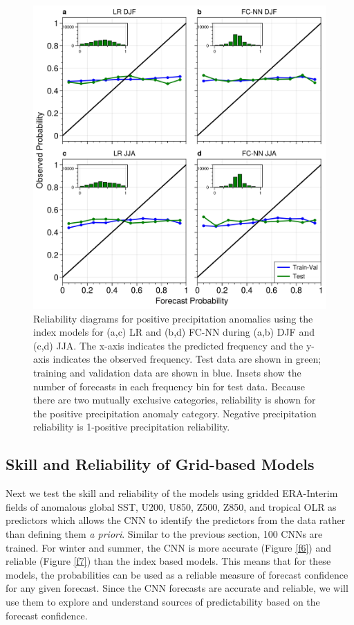 \documentclass{ametsocV6.1}
\begin{document}
\begin{figure}[t]
  \noindent\includegraphics[width=30pc,angle=0]{Figure5.jpg}
  \caption{Reliability diagrams for positive precipitation anomalies using the index models for (a,c) LR and (b,d) FC-NN during (a,b) DJF and (c,d) JJA.  The x-axis indicates the predicted frequency and the y-axis indicates the observed frequency.  Test data are shown in green; training and validation data are shown in blue.  Insets show the number of forecasts in each frequency bin for test data.  Because there are two mutually exclusive categories, reliability is shown for the positive precipitation anomaly category.  Negative precipitation reliability is 1-positive precipitation reliability.}\label{f5}
\end{figure}

\subsection{Skill and Reliability of Grid-based Models}
\label{sec:resultsgrid}

Next we test the skill and reliability of the models using gridded ERA-Interim fields of anomalous global SST, U200, U850, Z500, Z850, and tropical OLR as predictors which allows the CNN to identify the predictors from the data rather than defining them \emph{a priori}. Similar to the previous section, 100 CNNs are trained. For winter and summer, the CNN is more accurate (Figure \ref{f6}) and reliable (Figure \ref{f7}) than the index based models. This means that for these models, the probabilities can be used as a reliable measure of forecast confidence for any given forecast. Since the CNN forecasts are accurate and reliable, we will use them to explore and understand sources of predictability based on the forecast confidence.
\end{document}
